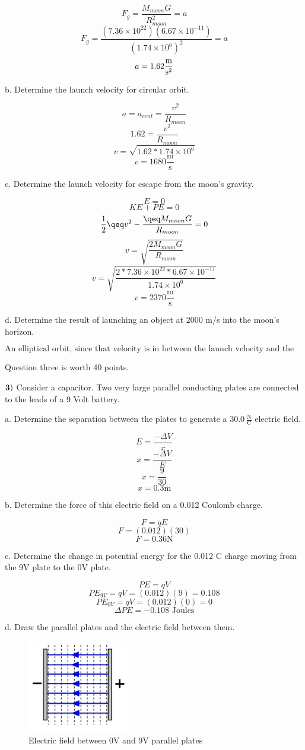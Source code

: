 \documentclass{article}
\begin{document}
 $$F_{g}=\frac{M_{moon}G}{R^{2}_{moon}}=a$$
 $$F_{g}=\frac{(7.36 \times 10^{22}) (6.67 \times 10^{-11})}{(1.74    \times 10^{6})^{2}}=a$$
 $$a=1.62 \frac{\text{m}}{\text s^{2}}$$

 
 b.  Determine the launch velocity for circular orbit.
 
 $$a=a_{cent}=\frac{v^{2}}{R_{moon}}$$ %
 $$1.62=\frac{v^{2}}{R_{moon}}$$
 $$v=\sqrt{1.62 * 1.74 \times 10^{6}}$$
 $$v=1680 \frac{\text{m}}{\text{s}}$$
 
 
 c.  Determine the launch velocity for escape from the moon's gravity.
 
 $${E}=0$$
 $$KE + PE=0$$
 $$\frac{1}{2}{\qeq}v^{2} - \frac{{\qeq}M_{moon}G}{R_{moon}}=0$$
 $$v=\sqrt{\frac{2M_{moon}G}{R_{moon}}}$$
 $$v=\sqrt{\frac{2 * 7.36 \times 10^{22} * 6.67 \times              10^{-11}}{1.74 \times 10^{6}}}$$
 $$v=2370 \frac{\text{m}}{\text{s}}$$ %
 
 
 \newpage
 d.  Determine the result of launching an object at 2000 m/s into the moon's horizon.
 
 $$\text {An elliptical orbit, since that velocity is in between the launch velocity and the escape velocity.}$$



  \newpage
Question three is worth 40 points.

  $\bf{3)}$  Consider a capacitor.  Two very large parallel conducting plates are connected to the leads of a 9 Volt battery.
  \vspace{0.5cm}
  
  a.  Determine the separation between the plates to generate a $30.0\  \frac{\text{N}}{\text{C}}$ electric field.
  
  $$E=\frac{-\Delta V}{x}$$ %
  $$x=\frac{-\Delta V}{E}$$ %
  $$x=\frac{9}{30}$$ %
  $$x=0.3 \text{m}$$
  
  
  b.  Determine the force of this electric field on a 0.012 Coulomb charge.
  
  $$F=qE$$ %
  $$F=(0.012)(30)$$
  $$F=0.36 \text{N}$$
  
  
  c.  Determine the change in potential energy for the 0.012 C charge moving from the 9V plate to the 0V plate.
  
  $$PE=qV$$
  $$PE_{9V}=qV=(0.012)(9)=0.108$$
  $$PE_{0V}=qV=(0.012)(0)=0$$
  $$\Delta PE=-0.108 \text{ Joules}$$
  
  
  \newpage
  d. Draw the parallel plates and the electric field between them.  
  \begin{figure}[h]
  \centering
  \includegraphics[width=0.4\textwidth]{efield}
  \caption{Electric field between 0V and 9V parallel plates}
  \end{figure}
  
  
  
\end{document}
